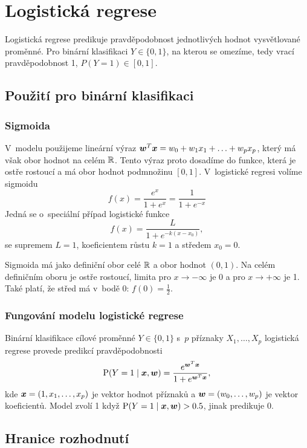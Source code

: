 \section{Logistická regrese}

Logistická regrese predikuje pravděpodobnost jednotlivých hodnot vysvětlované proměnné. Pro binární klasifikaci $Y \in \{0, 1\}$, na kterou se omezíme, tedy vrací pravděpodobnost 1, $P(Y = 1) \in [0, 1]$.

\subsection{Použití pro binární klasifikaci}

\subsubsection{Sigmoida}

V~modelu použijeme lineární výraz $\bm{w}^T\bm{x} = w_0 + w_1 x_1 + \ldots + w_p x_p$, který má však obor hodnot na celém $\mathbb{R}$. Tento výraz proto dosadíme do funkce, která je ostře rostoucí a má obor hodnot podmnožinu $[0, 1]$. V~logistické regresi volíme sigmoidu
\[f(x) = \frac{e^x}{1+e^x} = \frac{1}{1+e^{-x}}\]
Jedná se o~speciální případ logistické funkce
\[f(x) = \frac{L}{1 + e^{-k(x-x_0)}},\]
se supremem $L=1$, koeficientem růstu $k=1$ a středem $x_0 = 0$.

Sigmoida má jako definiční obor celé $\mathbb{R}$ a obor hodnot $(0, 1)$. Na celém definičním oboru je ostře rostoucí, limita pro $x \rightarrow -\infty$ je 0 a pro $x \rightarrow +\infty$ je 1. Také platí, že střed má v~bodě 0: $f(0) = \frac{1}{2}$.

\subsubsection{Fungování modelu logistické regrese}

Binární klasifikace cílové proměnné $Y \in \{0,1\}$ s~$p$ příznaky ${X_1, \ldots, X_p}$ logistická regrese provede predikcí pravděpodobnosti
\begin{equation*}
    \text{P} (Y=1 \mid \bm{x}, \bm{w} ) = \frac{e^{\bm{w}^T\bm{x}}}{1 + e^{\bm{w}^T\bm{x}}},
\end{equation*}
kde $\bm{x} = (1, x_1, \ldots, x_p)$ je vektor hodnot příznaků a $\bm{w} = (w_0, \ldots, w_p)$ je vektor koeficientů. Model zvolí 1 když $\text{P} (Y=1 \mid \bm{x}, \bm{w} ) > 0.5$, jinak predikuje 0.

\subsection{Hranice rozhodnutí}

